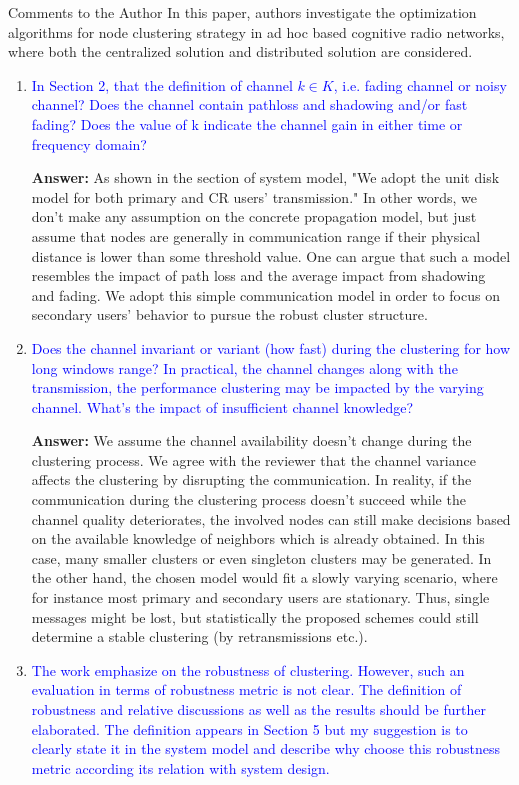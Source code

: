 \documentclass[10pt,a4paper]{article}
\begin{document}
Comments to the Author
In this paper, authors investigate the optimization algorithms for node clustering strategy in ad hoc based cognitive radio networks, where both the centralized solution and distributed solution are considered.
\begin{enumerate}


\item \textcolor{blue}{ In Section 2, that the definition of channel $k\in K$, i.e. fading channel or noisy channel? Does the channel contain pathloss and shadowing and/or fast fading? Does the value of k indicate the channel gain in either time or frequency domain? }

\textbf{Answer:} As shown in the section of system model, "We adopt the unit disk model for both primary and CR users’ transmission."
In other words, we don't make any assumption on the concrete propagation model, but just assume that nodes are generally in communication range if their physical distance is lower than some threshold value. One can argue that such a model resembles the impact of path loss and the average impact from shadowing and fading.
We adopt this simple communication model in order to focus on secondary users' behavior to pursue the robust cluster structure.

\item \textcolor{blue}{ Does the channel invariant or variant (how fast) during the clustering for how long windows range? In practical, the channel changes along with the transmission, the performance clustering may be impacted by the varying channel. What's the impact of insufficient channel knowledge?}

\textbf{Answer:} We assume the channel availability doesn't change during the clustering process.
We agree with the reviewer that the channel variance affects the clustering by disrupting the communication.
In reality, if the communication during the clustering process doesn't succeed while the channel quality deteriorates, the involved nodes can still make decisions based on the available knowledge of neighbors which is already obtained.
In this case, many smaller clusters or even singleton clusters may be generated.
%
In the other hand, the chosen model would fit a slowly varying scenario, where for instance most primary and secondary users are stationary. Thus, single messages might be lost, but statistically the proposed schemes could still determine a stable clustering (by retransmissions etc.).


\item \textcolor{blue}{ The work emphasize on the robustness of clustering. However, such an evaluation in terms of robustness metric is not clear. The definition of robustness and relative discussions as well as the results should be further elaborated. The definition appears in Section 5 but my suggestion is to clearly state it in the system model and describe why choose this robustness metric according its relation with system design.}


\end{enumerate}
\end{document}
